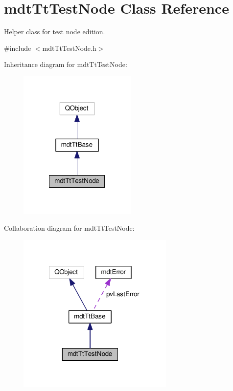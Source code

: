 \hypertarget{classmdt_tt_test_node}{\section{mdt\-Tt\-Test\-Node Class Reference}
\label{classmdt_tt_test_node}
}


Helper class for test node edition.  




{\ttfamily \#include $<$mdt\-Tt\-Test\-Node.\-h$>$}



Inheritance diagram for mdt\-Tt\-Test\-Node\-:
\nopagebreak
\begin{figure}[H]
\begin{center}
\leavevmode
\includegraphics[width=164pt]{classmdt_tt_test_node__inherit__graph}
\end{center}
\end{figure}


Collaboration diagram for mdt\-Tt\-Test\-Node\-:
\nopagebreak
\begin{figure}[H]
\begin{center}
\leavevmode
\includegraphics[width=218pt]{classmdt_tt_test_node__coll__graph}
\end{center}
\end{figure}
